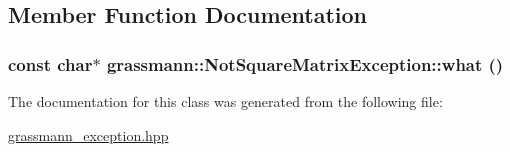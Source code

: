 \subsection{Member Function Documentation}
\hypertarget{classgrassmann_1_1NotSquareMatrixException_95dca75bbfe447e3a36449fb0087f646}{
\subsubsection[what]{\setlength{\rightskip}{0pt plus 5cm}const char$\ast$ grassmann::NotSquareMatrixException::what ()}}
\label{classgrassmann_1_1NotSquareMatrixException_95dca75bbfe447e3a36449fb0087f646}




The documentation for this class was generated from the following file:\begin{CompactItemize}
\item 
\hyperlink{grassmann__exception_8hpp}{grassmann\_\-exception.hpp}\end{CompactItemize}
